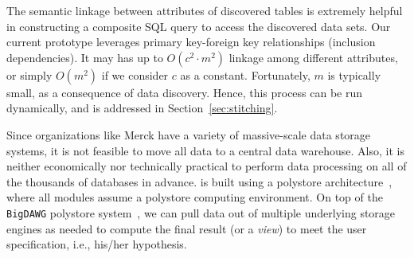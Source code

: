 The semantic linkage between attributes of discovered tables is extremely helpful in constructing a composite \textsf{SQL} query to access the discovered data sets. 
%
Our current prototype leverages primary key-foreign key relationships (inclusion dependencies).
It may has up to $O(c^2 \cdot m^2)$ linkage among different attributes, or simply $O(m^2)$ if we consider $c$ as a constant.
%
Fortunately, $m$ is typically small, as a consequence of data discovery.
Hence, this process can be run dynamically, and is addressed in Section~\ref{sec:stitching}.



Since organizations like Merck have a variety of massive-scale data storage systems, it is not feasible to move all data to a central data warehouse. Also, it is neither economically nor technically practical to perform data processing on all of the thousands of databases in advance. 
\dcv is built using a polystore architecture~\cite{DBLP:journals/sigmod/DugganESBHKMMMZ15}, where all modules assume a polystore computing environment.
On top of the \texttt{BigDAWG} polystore system~\cite{DBLP:journals/pvldb/ElmoreDSBCGHHKK15}, we can pull data out of multiple underlying storage engines as needed to compute the final result (or a {\em view}) to meet the user specification, i.e., his/her hypothesis. 



